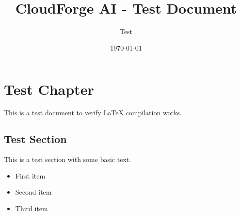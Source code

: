 \documentclass[12pt,a4paper]{report}
\begin{document}
\title{CloudForge AI - Test Document}
\author{Test}
\date{\today}
\maketitle

\chapter{Test Chapter}

This is a test document to verify LaTeX compilation works.

\section{Test Section}

This is a test section with some basic text.

\begin{itemize}
\item First item
\item Second item
\item Third item
\end{itemize}
\end{document}
